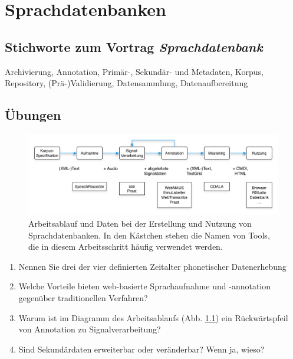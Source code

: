 \documentclass[11pt]{book}
\begin{document}
\chapter{Sprachdatenbanken}

\section{Stichworte zum Vortrag \em{Sprachdatenbank}}

Archivierung, Annotation, Primär-, Sekundär- und Metadaten, Korpus, Repository, (Prä-)Validierung, Datensammlung, Datenaufbereitung

\section{Übungen}

\begin{figure}[htbp]
\begin{center}
\includegraphics[width=1\textwidth]{grafiken/sprachdatenbanken/workflow-de-2}
\caption{Arbeitsablauf und Daten bei der Erstellung und Nutzung von Sprachdatenbanken. In den Kästchen stehen die Namen von Tools, die in diesem Arbeitsschritt häufig verwendet werden.}
\label{fig_sdb_arbeitsablauf}
\end{center}
\end{figure}

\begin{enumerate}
\item{Nennen Sie drei der vier definierten Zeitalter phonetischer Datenerhebung}
\vspace{2cm}
\item{Welche Vorteile bieten web-basierte Sprachaufnahme und -annotation gegenüber traditionellen Verfahren?}
\vspace{2cm}
\item{Warum ist im Diagramm des Arbeitsablaufs (Abb. \ref{fig_sdb_arbeitsablauf}) ein Rückwärtspfeil von Annotation zu Signalverarbeitung?}
\vspace{2cm}
\item{Sind Sekundärdaten erweiterbar oder veränderbar? Wenn ja, wieso?}
\vspace{2cm}
\end{enumerate}
\end{document}
